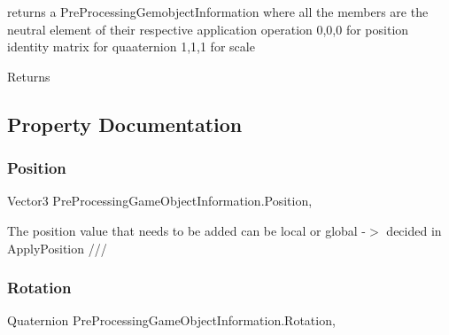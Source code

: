 returns a Pre\+Processing\+Gemobject\+Information where all the members are the neutral element of their respective application operation 0,0,0 for position identity matrix for quaaternion 1,1,1 for scale 

\begin{DoxyReturn}{Returns}

\end{DoxyReturn}


\subsection{Property Documentation}
\mbox{\label{class_pre_processing_game_object_information_ae7d763dae363a10176299f0dda2347fb}} 
\subsubsection{\texorpdfstring{Position}{Position}}
{\footnotesize\ttfamily Vector3 Pre\+Processing\+Game\+Object\+Information.\+Position\hspace{0.3cm}{\ttfamily [protected get]}, {\ttfamily [set]}}



The position value that needs to be added can be local or global -\/$>$ decided in Apply\+Position /// 

\mbox{\label{class_pre_processing_game_object_information_a6b7430b36e281c146006f54390a9b555}} 
\subsubsection{\texorpdfstring{Rotation}{Rotation}}
{\footnotesize\ttfamily Quaternion Pre\+Processing\+Game\+Object\+Information.\+Rotation\hspace{0.3cm}{\ttfamily [protected get]}, {\ttfamily [set]}}



